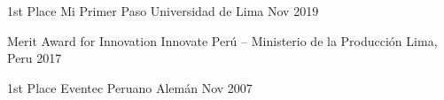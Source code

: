 

\divider


\cvhonor
    {\faTrophy}
    {1st Place}
    {Mi Primer Paso}
    {Universidad de Lima}
    {Nov 2019}

\cvhonor
    {\faTrophy}
    {Merit Award for Innovation}
    {Innovate Perú – Ministerio de la Producción}
    {Lima, Peru}
    {2017}

\cvhonor
    {\faTrophy}
    {1st Place}
    {Eventec}
    {Peruano Alemán}
    {Nov 2007}

\divider